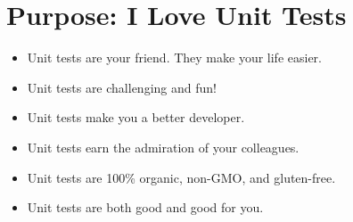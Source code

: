 \documentclass{article}
\begin{document}
\sloppy
\section{Purpose: I Love Unit Tests}
\begin{itemize}
    \item Unit tests are your friend. They make your life easier.
    \item Unit tests are challenging and fun!
    \item Unit tests make you a better developer.
    \item Unit tests earn the admiration of your colleagues.
    \item Unit tests are 100\% organic, non-GMO, and gluten-free.
    \item Unit tests are both good and good for you.
\end{itemize}
\end{document}

